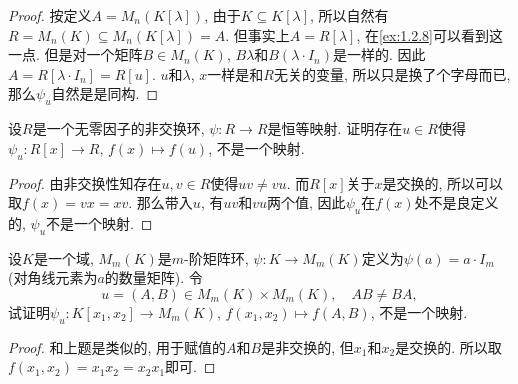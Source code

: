 \begin{proof}
    按定义$A = M_n(K[\lambda])$, 由于$K \subseteq K[\lambda]$, 所以自然有$R = M_n(K) \subseteq M_n(K[\lambda]) = A$. 但事实上$A = R[\lambda]$, 在\ref{ex:1.2.8}可以看到这一点. 但是对一个矩阵$B \in M_n(K)$, $B\lambda$和$B(\lambda \cdot I_n)$是一样的. 因此$A = R[\lambda \cdot I_n] = R[u]$. $u$和$\lambda$, $x$一样是和$R$无关的变量, 所以只是换了个字母而已, 那么$\psi_u$自然是是同构.
\end{proof}

\begin{problem}\label{ex:2.4.7}
    设$R$是一个无零因子的非交换环, $\psi:R \to R$是恒等映射. 证明存在$u \in R$使得$\psi_u:R[x] \to R$, $f(x) \mapsto f(u)$, 不是一个映射.
\end{problem}
    
\begin{proof}
    由非交换性知存在$u, v \in R$使得$uv \neq vu$. 而$R[x]$关于$x$是交换的, 所以可以取$f(x) = vx = xv$. 那么带入$u$, 有$uv$和$vu$两个值, 因此$\psi_u$在$f(x)$处不是良定义的, $\psi_u$不是一个映射.
\end{proof}

\begin{problem}\label{ex:2.4.8}
    设$K$是一个域, $M_m(K)$是$m$-阶矩阵环, $\psi:K \to M_m(K)$定义为$\psi(a) = a \cdot I_{m}$(对角线元素为$a$的数量矩阵). 令
    \[
        u = (A, B) \in M_m(K) \times M_m(K),\quad AB \neq BA,
    \]
    试证明$\psi_u:K[x_1, x_2] \to M_m(K),\, f(x_1, x_2) \mapsto f(A, B)$, 不是一个映射.
\end{problem}

\begin{proof}
    和上题是类似的, 用于赋值的$A$和$B$是非交换的, 但$x_1$和$x_2$是交换的. 所以取$f(x_1, x_2) = x_1x_2 = x_2x_1$即可.
\end{proof}

